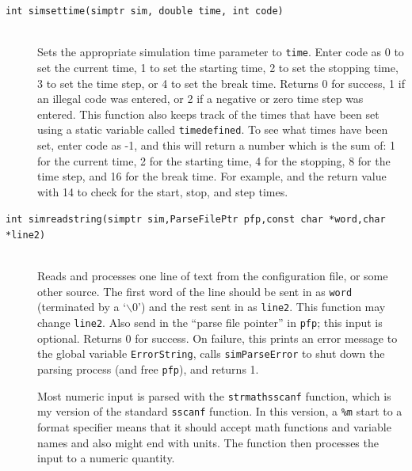 \documentclass {scrbook}
\newcommand {\ttt} {\texttt}
\begin{document}
\begin{description}
\item[\ttt{int simsettime(simptr sim, double time, int code)}]
\hfill \\
Sets the appropriate simulation time parameter to \ttt{time}. Enter code as 0 to set the current time, 1 to set the starting time, 2 to set the stopping time, 3 to set the time step, or 4 to set the break time. Returns 0 for success, 1 if an illegal code was entered, or 2 if a negative or zero time step was entered. This function also keeps track of the times that have been set using a static variable called \ttt{timedefined}. To see what times have been set, enter code as -1, and this will return a number which is the sum of: 1 for the current time, 2 for the starting time, 4 for the stopping, 8 for the time step, and 16 for the break time. For example, and the return value with 14 to check for the start, stop, and step times.

\item[\ttt{int simreadstring(simptr sim,ParseFilePtr pfp,const char *word,char *line2)}]
\hfill \\
Reads and processes one line of text from the configuration file, or some other source. The first word of the line should be sent in as \ttt{word} (terminated by a `$\backslash$0') and the rest sent in as \ttt{line2}. This function may change \ttt{line2}. Also send in the ``parse file pointer'' in \ttt{pfp}; this input is optional. Returns 0 for success. On failure, this prints an error message to the global variable \ttt{ErrorString}, calls \ttt{simParseError} to shut down the parsing process (and free \ttt{pfp}), and returns 1.

Most numeric input is parsed with the \ttt{strmathsscanf} function, which is my version of the standard \ttt{sscanf} function. In this version, a \ttt{\%m} start to a format specifier means that it should accept math functions and variable names and also might end with units. The function then processes the input to a numeric quantity.


\end{description}
\end{document}
